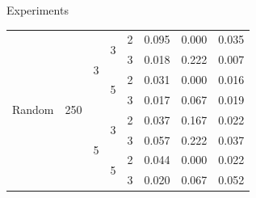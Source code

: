\documentclass{beamer}
\begin{document}
\begin{frame}{Experiments}
\begin{table}[H]
\begin{minipage}{.48\columnwidth}
\begin{adjustbox}{width=\columnwidth}
\begin{tabular}{lllllrrr}
                    \cline{1-8} \cline{2-8} \cline{3-8} \cline{4-8}
                    \multirow[t]{16}{*}{Random} & \multirow[t]{8}{*}{250} & \multirow[t]{4}{*}{3} & \multirow[t]{2}{*}{3} & 2          & 0.095           & 0.000        & 0.035        \\
                                                &                         &                       &                       & 3          & 0.018           & 0.222        & 0.007        \\
                    \cline{4-8}
                                                &                         &                       & \multirow[t]{2}{*}{5} & 2          & 0.031           & 0.000        & 0.016        \\
                                                &                         &                       &                       & 3          & 0.017           & 0.067        & 0.019        \\
                    \cline{3-8} \cline{4-8}
                                                &                         & \multirow[t]{4}{*}{5} & \multirow[t]{2}{*}{3} & 2          & 0.037           & 0.167        & 0.022        \\
                                                &                         &                       &                       & 3          & 0.057           & 0.222        & 0.037        \\
                    \cline{4-8}
                                                &                         &                       & \multirow[t]{2}{*}{5} & 2          & 0.044           & 0.000        & 0.022        \\
                                                &                         &                       &                       & 3          & 0.020           & 0.067        & 0.052        \\
                    \cline{1-8} \cline{2-8} \cline{3-8} \cline{4-8}
                \end{tabular}
            \end{adjustbox}

\end{minipage}
\end{table}
\end{frame}
\end{document}
